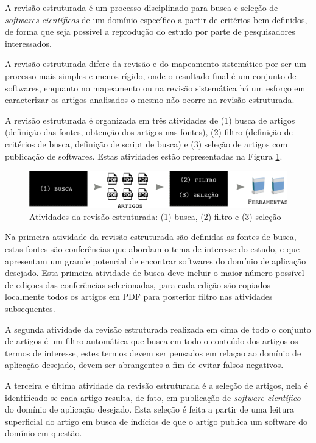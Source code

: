 A revisão estruturada é um processo disciplinado para busca e seleção de {\it
softwares científicos} de um domínio específico a partir de critérios bem
definidos, de forma que seja possível a reprodução do estudo por parte de
pesquisadores interessados.

A revisão estruturada difere da revisão e do mapeamento sistemático por ser um
processo mais simples e menos rígido, onde o resultado final é um conjunto de
softwares, enquanto no mapeamento ou na revisão sistemática há um esforço em
caracterizar os artigos analisados o mesmo não ocorre na revisão estruturada.

A revisão estruturada é organizada em três atividades de (1) busca de artigos
(definição das fontes, obtenção dos artigos nas fontes), (2) filtro (definição
de critérios de busca, definição de script de busca) e (3) seleção de artigos
com publicação de softwares. Estas atividades estão representadas na Figura
\ref{figura-revisao-estruturada}.

\begin{figure}[h]
  \center
  \includegraphics[scale=0.33]{imagens/revisao-estruturada.png}
  \caption{Atividades da revisão estruturada: (1) busca, (2) filtro e (3) seleção}
  \label{figura-revisao-estruturada}
\end{figure}

Na primeira atividade da revisão estruturada são definidas as fontes de busca,
estas fontes são conferências que abordam o tema de interesse do estudo, e que
apresentam um grande potencial de encontrar softwares do domínio de aplicação
desejado. Esta primeira atividade de busca deve incluir o maior número possível
de ediçoes das conferências selecionadas, para cada edição são copiados
localmente todos os artigos em PDF para posterior filtro nas atividades
subsequentes.

A segunda atividade da revisão estruturada realizada em cima de todo o conjunto
de artigos é um filtro automática que busca em todo o conteúdo dos artigos os
termos de interesse, estes termos devem ser pensados em relaçao ao domínio de
aplicação desejado, devem ser abrangentes a fim de evitar falsos negativos.

A terceira e última atividade da revisão estruturada é a seleção de artigos,
nela é identificado se cada artigo resulta, de fato, em publicação de {\it
software científico} do domínio de aplicação desejado. Esta seleção é feita a
partir de uma leitura superficial do artigo em busca de indícios de que o
artigo publica um software do domínio em questão.

